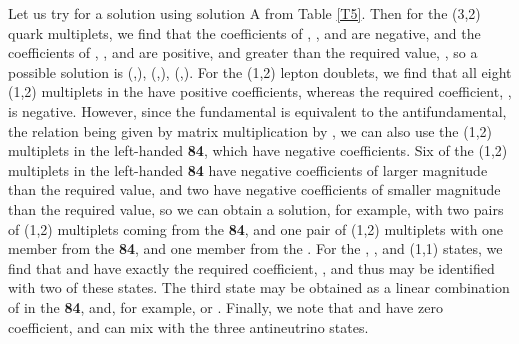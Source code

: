 \documentclass[a4paper,12pt,oneside]{article}
\begin{document}
Let us try for a solution using solution A from Table \ref{T5}.  
Then for the (3,2) quark multiplets, we find that the \coordHE{} 
coefficients of \coordHE{}, \coordHE{}, and \coordHE{} are
negative, and the \coordHE{} coefficients of \coordHE{}, \coordHE{}, and
\coordHE{} are positive, and greater than the required value,
\coordHE{}, so a possible solution is 
(\coordHE{},\coordHE{}), (\coordHE{},\coordHE{}), 
(\coordHE{},\coordHE{}).
For the (1,2) lepton doublets, we find that all eight (1,2)
multiplets in the \coordHE{} have positive \coordHE{}
coefficients, whereas the required \coordHE{} coefficient,
\coordHE{}, is negative.  However, since the 
\coordHE{} fundamental is equivalent to the antifundamental,
the relation being given by matrix multiplication by 
\coordHE{}, we can also use the (1,2) multiplets in the
left-handed \textbf{84}, which have negative \coordHE{} coefficients.  Six
of the (1,2) multiplets in the left-handed \textbf{84} have 
negative \coordHE{} coefficients of larger magnitude than the required
value, and two have negative \coordHE{} coefficients of smaller magnitude
than the required value, so we can obtain a solution, for example,
with two pairs of (1,2) multiplets coming from the \textbf{84}, and
one pair of (1,2) multiplets with one member from the \textbf{84},
and one member from the \coordHE{}.  For the \coordHE{},
\myHighlight{$\mu^+$}\coordHE{}, and \myHighlight{$\tau^+$}\coordHE{} (1,1) states, we find that \coordHE{} and
\coordHE{} have exactly the required \coordHE{} coefficient, 
\coordHE{}, and thus may be identified with two of these
states.  The third state may be obtained as a linear combination of
\coordHE{} in the \textbf{84}, and, for example, \coordHE{} or
\coordHE{}.  Finally, we note that \coordHE{} and \coordHE{} have
zero \coordHE{} coefficient, and can mix with the three 
\coordHE{} antineutrino states.
\end{document}
